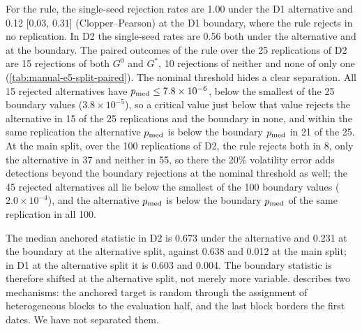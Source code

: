 For the rule, the single-seed rejection rates are 1.00 under the D1 alternative and 0.12 [0.03,
0.31] (Clopper--Pearson) at the D1 boundary, where the rule rejects in no replication. In D2 the
single-seed rates are 0.56 both under the alternative and at the boundary. The paired outcomes of
the rule over the 25 replications of D2 are 15 rejections of both $G^0$ and $G^*$, 10 rejections of
neither and none of only one (\cref{tab:manual-e5-split-paired}). The nominal threshold hides a
clear separation. All 15 rejected alternatives have $p_{\mathrm{med}}\le7.8\times10^{-6}$, below the
smallest of the 25 boundary values ($3.8\times10^{-5}$), so a critical value just below that
value rejects the alternative in 15 of the 25 replications and the boundary in none, and within the
same replication the alternative $\pmed$ is below the boundary $\pmed$ in 21 of the 25. At the
main split, over the 100 replications of D2, the rule rejects both in 8, only the alternative in 37
and neither in 55, so there the 20\% volatility error adds detections beyond the boundary
rejections at the nominal threshold as well; the 45 rejected alternatives all lie below the
smallest of the 100 boundary values ($2.0\times10^{-4}$), and the alternative $\pmed$ is below the
boundary $\pmed$ of the same replication in all 100.

\begin{table}[tbp]
  \centering
  \caption{Paired outcomes of the verdict rule at the alternative and at the boundary of the power
    designs, at the main split (E3, 100 replications) and at the alternative split (E5, 25
    replications); $\pmed$ over five synthetic seeds, $\alpha=0.05$. Rule at 5\%: replications in
    which both $G^*=1.2\,G^0$ and $G^0$ are rejected, only $G^*$, or neither (no replication
    rejects only $G^0$). $\pmed$: smallest boundary value over the replications and largest value
    among the rejected alternatives. Alternative below: number of replications whose alternative
    $\pmed$ is below the smallest boundary $\pmed$, and below the boundary $\pmed$ of the same
    replication. Derived from \texttt{results/e3/e3\_power\_raw.csv},
    \texttt{e3\_realvol\_raw.csv} and \texttt{results/e5/e5\_split\_power\_raw.csv} by
    \texttt{paper/scripts/e5\_split\_discrimination.py}.}
  \label{tab:manual-e5-split-paired}
  \small
\end{table} The median anchored statistic in D2 is 0.673 under the
alternative and 0.231 at the boundary at the alternative split, against 0.638 and 0.012 at the
main split; in D1 at the alternative split it is 0.603 and 0.004. The boundary statistic is
therefore shifted at the alternative split, not merely more variable. 
describes two mechanisms: the anchored target is random through the assignment of heterogeneous
\TRAIN{} blocks to the evaluation half, and the last \TRAIN{} block borders the first \TEST{}
dates. We have not separated them.


